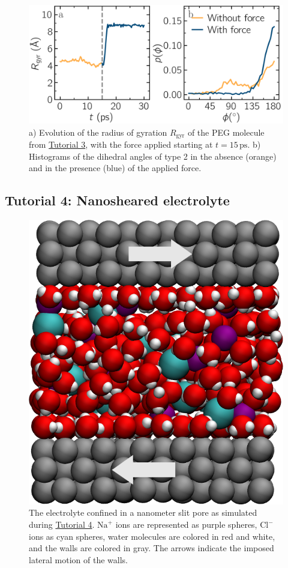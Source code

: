 \documentclass[9pt,tutorial]{livecoms}
\begin{document}
\begin{figure}
\centering
\includegraphics[width=\linewidth]{PEG-distance}
\caption{a) Evolution of
the radius of gyration $R_\text{gyr}$ of the PEG molecule
from \hyperref[all-atom-label]{Tutorial 3}, with the force
applied starting at $t = 15\,\text{ps}$.  b) Histograms of the dihedral angles of type 2
in the absence (orange) and in the presence (blue) of the applied force.}
\label{fig:PEG-distance}
\end{figure}

\subsection{Tutorial 4: Nanosheared electrolyte}
\label{sheared-confined-label}

\begin{figure}
\centering
\includegraphics[width=0.55\linewidth]{NANOSHEAR}
\caption{The electrolyte confined in a nanometer slit pore as simulated during
\hyperref[sheared-confined-label]{Tutorial 4}.  $\text{Na}^+$ ions are represented
as purple spheres, $\text{Cl}^-$ ions as cyan spheres, water molecules are colored
in red and white, and the walls are colored in gray.  The arrows indicate the
imposed lateral motion of the walls.}
\label{fig:NANOSHEAR}
\end{figure}
\end{document}
